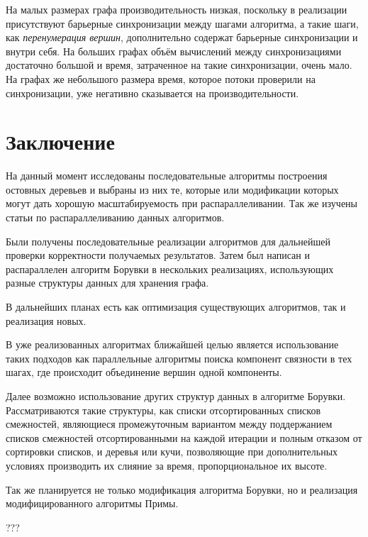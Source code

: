 \documentclass[a4paper,10pt]{extarticle}
\begin{document}
На малых размерах графа производительность низкая, поскольку в реализации присутствуют барьерные синхронизации между шагами алгоритма, а такие шаги, как \textit{перенумерация вершин}, дополнительно содержат барьерные синхронизации и внутри себя. На больших графах объём вычислений  между синхронизациями достаточно большой и время, затраченное на такие синхронизации, очень мало. На графах же небольшого размера время, которое потоки проверили на синхронизации, уже негативно сказывается на производительности.



\newpage
\section{Заключение}
На данный момент исследованы последовательные алгоритмы построения остовных деревьев и выбраны из них те, которые или модификации которых могут дать хорошую масштабируемость при распараллеливании. Так же изучены статьи  \cite{dense-mst,boruvka-prima,boruvka-cm5} по распараллеливанию данных алгоритмов.

Были получены последовательные реализации алгоритмов для дальнейшей проверки корректности получаемых результатов. Затем был написан и распараллелен алгоритм Борувки в нескольких реализациях, использующих разные структуры данных для хранения графа.

В дальнейших планах есть как оптимизация существующих алгоритмов, так и реализация новых.

В уже реализованных алгоритмах ближайшей целью является использование таких подходов как параллельные алгоритмы поиска компонент связности в тех шагах, где происходит объединение вершин одной компоненты.

Далее возможно использование других  структур данных в алгоритме Борувки. Рассматриваются такие структуры, как списки отсортированных списков смежностей, являющиеся промежуточным вариантом между поддержанием списков смежностей отсортированными на каждой итерации и полным отказом от сортировки списков, и деревья или кучи, позволяющие при дополнительных условиях производить их слияние за время, пропорциональное их высоте.

Так же планируется не только модификация алгоритма Борувки, но и реализация модифицированного алгоритмы Примы.

\newpage
???


\end{document}
